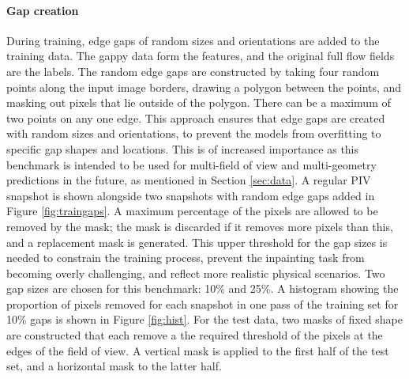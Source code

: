 \documentclass{article}
\begin{document}
\paragraph{Gap creation}
During training, edge gaps of random sizes and orientations are added to the training data. The gappy data form the features, and the original full flow fields are the labels. The random edge gaps are constructed by taking four random points along the input image borders, drawing a polygon between the points, and masking out pixels that lie outside of the polygon. There can be a maximum of two points on any one edge. This approach ensures that edge gaps are created with random sizes and orientations, to prevent the models from overfitting to specific gap shapes and locations. This is of increased importance as this benchmark is intended to be used for multi-field of view and multi-geometry predictions in the future, as mentioned in Section \ref{sec:data}.
A regular PIV snapshot is shown alongside two snapshots with random edge gaps added in Figure \ref{fig:traingaps}. A maximum percentage of the pixels are allowed to be removed by the mask; the mask is discarded if it removes more pixels than this, and a replacement mask is generated. This upper threshold for the gap sizes is needed to constrain the training process, prevent the inpainting task from becoming overly challenging, and reflect more realistic physical scenarios. Two gap sizes are chosen for this benchmark: 10\% and 25\%. 
A histogram showing the proportion of pixels removed for each snapshot in one pass of the training set for 10\% gaps is shown in Figure \ref{fig:hist}. For the test data, two masks of fixed shape are constructed that each remove a the required threshold of the pixels at the edges of the field of view. A vertical mask is applied to the first half of the test set, and a horizontal mask to the latter half. 
\end{document}
